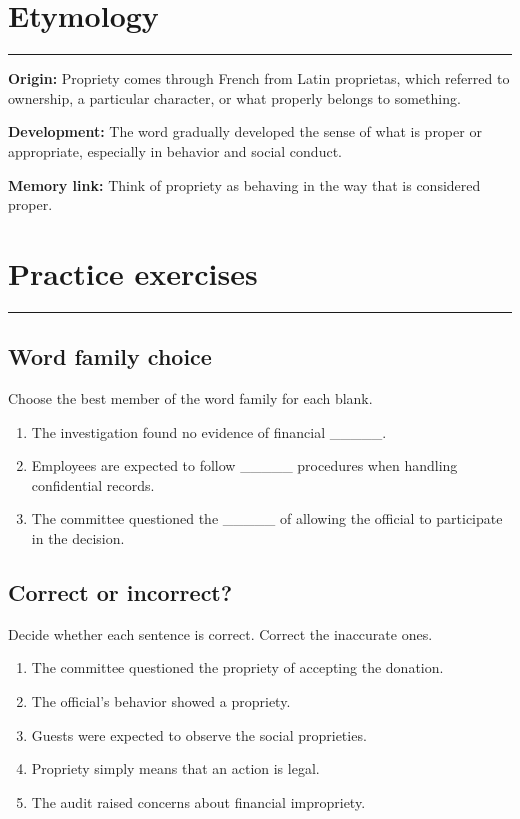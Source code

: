 \documentclass[11pt]{article}
\newcommand{\sectionrule}{\par\vspace{-0.5em}\noindent\textcolor{Accent}{\rule{\linewidth}{0.6pt}}\par}
\begin{document}
\section{Etymology}
\sectionrule
\textbf{Origin:} Propriety comes through French from Latin proprietas, which referred to ownership, a particular character, or what properly belongs to something.

\textbf{Development:} The word gradually developed the sense of what is proper or appropriate, especially in behavior and social conduct.

\textbf{Memory link:} Think of propriety as behaving in the way that is considered proper.

\section{Practice exercises}
\sectionrule
\subsection{Word family choice}
Choose the best member of the word family for each blank.

\begin{enumerate}
  \item The investigation found no evidence of financial \_\_\_\_\_.
  \item Employees are expected to follow \_\_\_\_\_ procedures when handling confidential records.
  \item The committee questioned the \_\_\_\_\_ of allowing the official to participate in the decision.
\end{enumerate}

\subsection{Correct or incorrect?}
Decide whether each sentence is correct. Correct the inaccurate ones.

\begin{enumerate}
  \item The committee questioned the propriety of accepting the donation.
  \item The official's behavior showed a propriety.
  \item Guests were expected to observe the social proprieties.
  \item Propriety simply means that an action is legal.
  \item The audit raised concerns about financial impropriety.
\end{enumerate}
\end{document}
